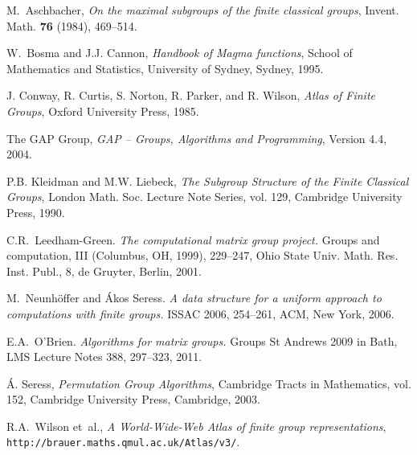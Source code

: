 \documentclass[a4paper,11pt]{article}
\begin{document}
\begin{thebibliography}{999}

M.~Aschbacher, \emph{On the maximal subgroups of the finite classical groups},
  Invent. Math. \textbf{76} (1984), 469--514.
  
W.~Bosma and J.J. Cannon, \emph{Handbook of {{\sc Magma}} functions}, School of
  Mathematics and Statistics, University of Sydney, Sydney, 1995.

J. Conway, R. Curtis, S. Norton, R. Parker, and R. Wilson, \emph{Atlas of
  {F}inite {G}roups}, Oxford University Press, 1985.
  
The {GAP} Group, \emph{{GAP} -- {G}roups, {A}lgorithms and {P}rogramming}, Version 4.4, 2004.

P.B. Kleidman and M.W. Liebeck, \emph{The {S}ubgroup {S}tructure of the
  {F}inite {C}lassical {G}roups}, London Math. Soc. Lecture Note Series, vol.
  129, Cambridge University Press, 1990.

C.R.~Leedham-Green. \emph{The computational matrix group project.}
  Groups and computation, III (Columbus, OH, 1999), 229--247, 
  Ohio State Univ. Math. Res. Inst. Publ., 8, de Gruyter, Berlin, 2001.

M.~Neunh{\"o}ffer and {\'A}kos Seress.
  \emph{A data structure for a uniform approach to computations with finite 
  groups.} ISSAC 2006, 254--261, ACM, New York, 2006. 

E.A.~O'Brien. \emph{Algorithms for matrix groups.}
    Groups St Andrews 2009 in Bath, LMS Lecture Notes 388, 297--323, 2011.

{\'A}. Seress, \emph{Permutation {G}roup {A}lgorithms}, Cambridge
  Tracts in Mathematics, vol. 152, Cambridge University Press, Cambridge, 2003.
  
R.A.~Wilson et~al., \emph{A {W}orld-{W}ide-{W}eb {A}tlas of finite group
  representations}, {\texttt{http://brauer.maths.qmul.ac.uk/Atlas/v3/}}.


\end{thebibliography}
\end{document}
